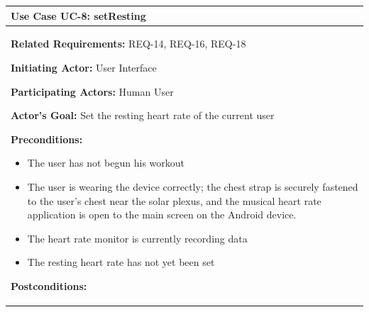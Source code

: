 \documentclass[letterpaper,english, 12pt]{scrreprt}
\begin{document}
\begin{center}
        \begin{longtable}{|C{15cm}|}
                \hline
                        \textbf{Use Case UC-8: setResting}\\

                \hline
                        \begin{flushleft}
                                \textbf{Related Requirements: } REQ-14, REQ-16, REQ-18
                        \end{flushleft}
                        \begin{flushleft}
                                \textbf{Initiating Actor: } User Interface
                        \end{flushleft}
                        \begin{flushleft}
                                \textbf{Participating Actors: } Human User
                        \end{flushleft}
                        \begin{flushleft}
                                \textbf{Actor's Goal: } Set the resting heart rate of the current user
                        \end{flushleft}
                        \begin{flushleft}
                                \textbf{Preconditions: }
                        \end{flushleft}
                                \begin{itemize}
                                        \item The user has not begun his workout
                                        \item The user is wearing the device correctly; the chest strap is securely fastened to the user’s chest near the solar plexus, and the musical heart rate application is open to the main screen on the Android device.
                                        \item The heart rate monitor is currently recording data
                                        \item The resting heart rate has not yet been set
                                \end{itemize}
                        \begin{flushleft}
                                \textbf{Postconditions: }
                        \end{flushleft}

\end{longtable}
\end{center}
\end{document}
